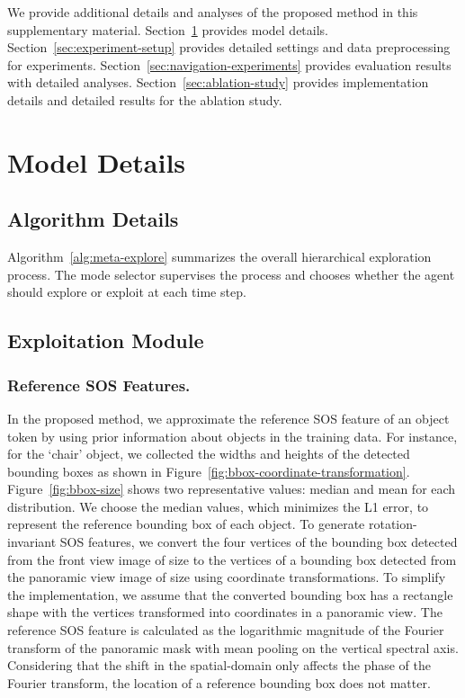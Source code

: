 \documentclass[10pt,twocolumn,letterpaper]{article}
\begin{document}
We provide additional details and analyses of the proposed method in this supplementary material. Section~\ref{sec:model-details} provides model details. Section~\ref{sec:experiment-setup} provides detailed settings and data preprocessing for experiments. Section~\ref{sec:navigation-experiments} provides evaluation results with detailed analyses. Section~\ref{sec:ablation-study} provides implementation details and detailed results for the ablation study.

\section{Model Details}\label{sec:model-details}
\subsection{Algorithm Details}
Algorithm~\ref{alg:meta-explore} summarizes the overall hierarchical exploration process. 
 The mode selector supervises the process and chooses whether the agent should explore or exploit at each time step.

\subsection{Exploitation Module}\label{sec:suppl-exploitation-module}
\subsubsection{Reference SOS Features.}
    In the proposed method, we approximate the reference SOS feature of an object token by using prior information about objects in the training data. For instance, for the `chair' object, we collected the widths and heights of the detected bounding boxes as shown in Figure~\ref{fig:bbox-coordinate-transformation}. Figure~\ref{fig:bbox-size} shows two representative values: median and mean for each distribution. We choose the median values, which minimizes the L1 error, to represent the reference bounding box of each object.
To generate rotation-invariant SOS features, we convert the four vertices of the bounding box detected from the front view image of size  to the vertices of a bounding box detected from the panoramic view image of size  using coordinate transformations. To simplify the implementation, we assume that the converted bounding box has a rectangle shape with the vertices transformed into coordinates in a panoramic view. The reference SOS feature is calculated as the logarithmic magnitude of the Fourier transform of the panoramic mask with mean pooling on the vertical spectral axis. Considering that the shift in the spatial-domain only affects the phase of the Fourier transform, the location of a reference bounding box does not matter.
\end{document}
